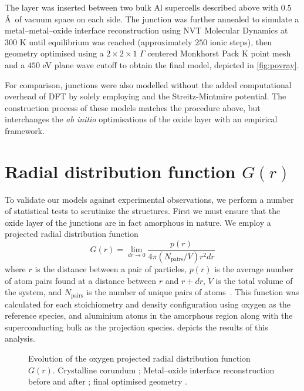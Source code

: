 The  layer was inserted between two bulk Al supercells described above with $0.5$ \AA\ of vacuum space on each side.
The junction was further annealed to simulate a metal--metal--oxide interface reconstruction using  NVT Molecular Dynamics at $300$ K until equilibrium was reached (approximately $250$ ionic steps), then geometry optimised using a $2\!\times\!2\!\times\!1$ $\Gamma$ centered Monkhorst Pack K point mesh and a $450$ eV plane wave cutoff to obtain the final model, depicted in \cref{fig:povray}.

For comparison, junctions were also modelled without the added computational overhead of DFT by solely employing  and the Streitz-Mintmire potential.
The construction process of these models matches the procedure above, but interchanges the \textit{ab initio} optimisations of the oxide layer with an empirical framework.

\section{Radial distribution function \texorpdfstring{$G(r)$}{G(r)}}
To validate our models against experimental observations, we perform a number of statistical tests to scrutinize the structures.
First we must ensure that the oxide layer of the junctions are in fact amorphous in nature.
We employ a projected radial distribution function
\begin{equation}
G(r) = \lim_{dr \to 0}\frac{p(r)}{4\pi\left(N_{\mathrm{pairs}}/V\right)r^2dr}
\end{equation}
where $r$ is the distance between a pair of particles, $p(r)$ is the average number of atom pairs found at a distance between $r$ and $r + dr$, $V$ is the total volume of the system, and $N_{\mathrm{pairs}}$ is the number of unique pairs of atoms~\cite{Levine2011}.
This function was calculated for each stoichiometry and density configuration using oxygen as the reference species, and aluminium atoms in the amorphous region along with the superconducting bulk as the projection species.  depicts the results of this analysis.

\begin{figure}[htp]
\resizebox{0.8\textwidth}{!}{}
\caption[Radial Distribution Function]{\label{fig:groptis}Evolution of the oxygen projected radial distribution function $G(r)$. Crystalline corundum ; Metal--oxide interface reconstruction before  and after ; final optimised geometry .}%
\end{figure}


